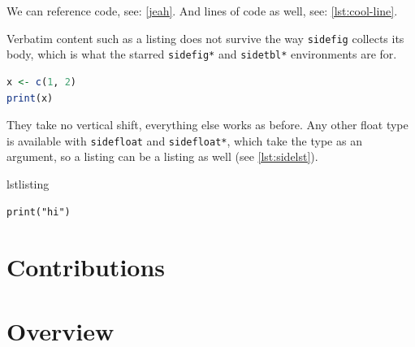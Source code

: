 We can reference code, see: \cref{jeah}.
And lines of code as well, see: \cref{lst:cool-line}.

Verbatim content such as a listing does not survive the way \texttt{sidefig} collects its body, which is what the starred \texttt{sidefig*} and \texttt{sidetbl*} environments are for.
\begin{sidefig*}
\begin{lstlisting}[language=R]
x <- c(1, 2)
print(x)
\end{lstlisting}
\caption{A listing within the margin.}
\label{fig:sidelst}
\end{sidefig*}
They take no vertical shift, everything else works as before.
Any other float type is available with \texttt{sidefloat} and \texttt{sidefloat*}, which take the type as an argument, so a listing can be a listing as well (see \cref{lst:sidelst}).
\begin{sidefloat*}{lstlisting}
\begin{verbatim}
print("hi")
\end{verbatim}
\caption{A real listing in the margin.}
\label{lst:sidelst}
\end{sidefloat*}

\section{Contributions}

\section{Overview}
